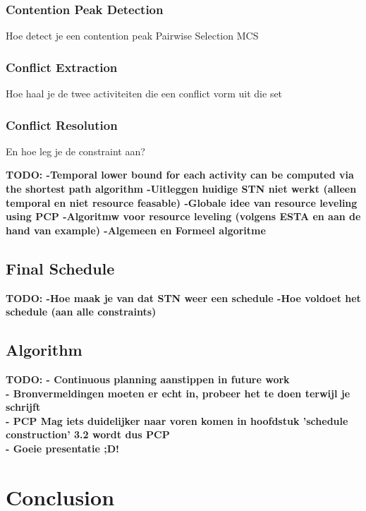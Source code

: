 \documentclass{article}
\theoremstyle{definition}
\newcommand{\TODO}[1]{{\color{red}\textbf{TODO: #1}}}
\begin{document}
\subsubsection{Contention Peak Detection}
Hoe detect je een contention peak
Pairwise Selection
MCS

\subsubsection{Conflict Extraction}
Hoe haal je de twee activiteiten die een conflict vorm uit die set

\subsubsection{Conflict Resolution}
En hoe leg je de constraint aan?


\TODO{
	-Temporal lower bound for each activity can be computed via the shortest path algorithm
		-Uitleggen huidige STN niet werkt (alleen temporal en niet resource feasable)
		-Globale idee van resource leveling using PCP
		-Algoritmw voor resource leveling (volgens ESTA en aan de hand van example)
		-Algemeen en Formeel algoritme
		}

\subsection{Final Schedule}

\TODO{
		-Hoe maak je van dat STN weer een schedule
		-Hoe voldoet het schedule (aan alle constraints)
}

\subsection{Algorithm}

\newpage

\TODO{
 - Continuous planning aanstippen in future work \\
 - Bronvermeldingen moeten er echt in, probeer het te doen terwijl je schrijft \\
 - PCP Mag iets duidelijker naar voren komen in hoofdstuk 'schedule construction' 3.2 wordt dus PCP \\
 - Goeie presentatie ;D!
 }

\newpage
 
\section{Conclusion}
\end{document}
